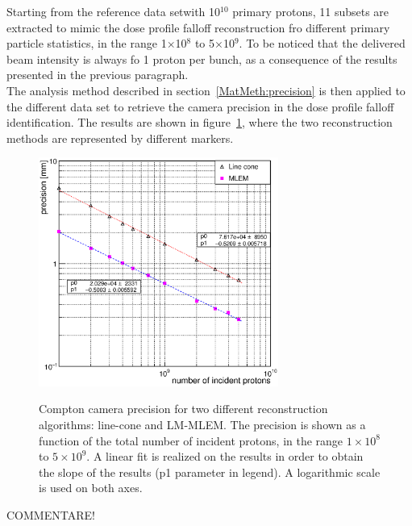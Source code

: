 Starting from the reference data setwith 10$^{10}$ primary protons, 11 subsets are extracted to mimic the dose profile falloff reconstruction fro different primary particle statistics, in the range 1$\times$10$^8$ to 5$\times$10$^9$. To be noticed that the delivered beam intensity is always fo 1 proton per bunch, as a consequence of the results presented in the previous paragraph.\\
The analysis method described in section~\ref{MatMeth:precision} is then applied to the different data set to retrieve the camera precision in the  dose profile falloff identification. The results are shown in figure~\ref{fig:precision}, where the two reconstruction methods are represented by different markers.\\

\begin{figure}[!hbtp]	
\centering
\caption{Compton camera precision for two different reconstruction algorithms: line-cone and LM-MLEM. The precision is shown as a function of the total number of incident protons, in the range $1\times10^{8}$ to $5\times10^{9}$. A linear fit is realized on the results in order to obtain the slope of the results (p1 parameter in legend). A logarithmic scale is used on both axes. }	
\includegraphics[width=0.7\textwidth]{./Figure/2017-10-21_Precision_Comparaison_linecone_MLEM_Article_Fit.eps}
\label{fig:precision}
\end{figure}

COMMENTARE!




